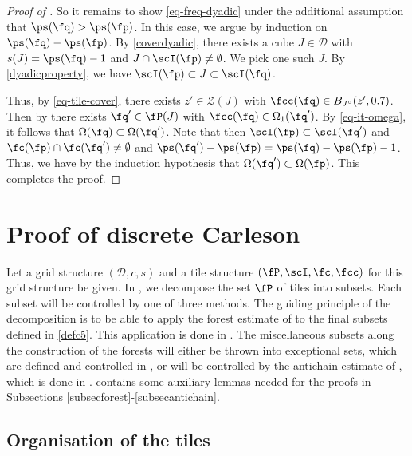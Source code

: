 \begin{proof}[Proof of ]
    So it remains to show \eqref{eq-freq-dyadic} under the additional assumption that $\ps(\fq) > \ps(\fp)$. In this case, we argue by induction on $\ps(\fq)-\ps(\fp)$. By \eqref{coverdyadic}, there exists a cube $J \in \mathcal{D}$ with $s(J) = \ps(\fq) - 1$ and $J \cap\scI(\fp) \ne \emptyset$. We pick one such $J$. By \eqref{dyadicproperty}, we have $\scI(\fp) \subset J \subset \scI(\fq)$.

    Thus, by \eqref{eq-tile-cover}, there exists $z' \in \mathcal{Z}(J)$ with $\fcc(\fq) \in B_{J^\circ}(z', 0.7)$. Then by  there exists $\fq' \in \fP(J)$ with $\fcc(\fq) \in\Omega_1(\fq')$.
    By \eqref{eq-it-omega}, it follows that $\Omega(\fq) \subset \Omega(\fq')$. Note that then $\scI(\fp) \subset \scI(\fq')$ and $\fc(\fp) \cap \fc(\fq') \ne \emptyset$ and $\ps(\fq') - \ps(\fp) = \ps(\fq) - \ps(\fp) - 1$. Thus, we have by the induction hypothesis that $\Omega(\fq') \subset \Omega(\fp)$. This completes the proof.
\end{proof}

\section{Proof of discrete Carleson}
\label{proptopropprop}



Let a grid structure $(\mathcal{D}, c, s)$ and a tile structure $(\fP, \scI, \fc, \fcc)$ for this grid structure be given. In , we decompose the set $\fP$ of tiles into subsets. Each subset will be controlled by one of three methods. The guiding principle of the decomposition is to be able to apply the forest estimate of  to the final subsets defined in \eqref{defc5}. This application is done in . The miscellaneous subsets along the construction of the forests will either be thrown into exceptional sets, which are defined and controlled in , or will be controlled by the antichain estimate of , which is done in .  contains some auxiliary lemmas needed for the proofs in Subsections \ref{subsecforest}-\ref{subsecantichain}.

\subsection{Organisation of the tiles}\label{subsectilesorg}

